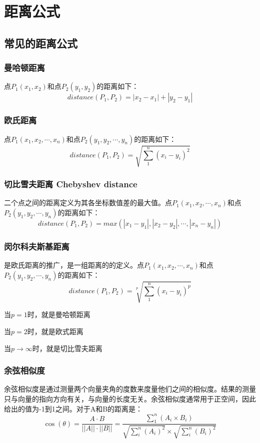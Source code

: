 \documentclass[12pt]{article}
\begin{document}
\section{距离公式}
\subsection{常见的距离公式}
\subsubsection{曼哈顿距离}
点$P_1(x_1, x_2)$和点$P_2(y_1, y_2)$的距离如下：
$$
distance(P_1, P_2) = |x_2 - x_1| + |y_2 - y_1|
$$

\subsubsection{欧氏距离}
点$P_1(x_1, x_2, \cdots, x_n)$和点$P_2(y_1, y_2, \cdots, y_n)$的距离如下：
$$
distance(P_1, P_2) = \sqrt{\sum_1^n(x_i-y_i)^2}
$$

\subsubsection{切比雪夫距离 Chebyshev distance}
二个点之间的距离定义为其各坐标数值差的最大值。点$P_1(x_1, x_2, \cdots, x_n)$和点$P_2(y_1, y_2, \cdots, y_n)$的距离如下：
$$
distance(P_1, P_2) = max(|x_1-y_1|, |x_2-y_2|, \cdots,|x_n-y_n|)
$$

\subsubsection{闵尔科夫斯基距离}
是欧氏距离的推广，是一组距离的的定义。点$P_1(x_1, x_2, \cdots, x_n)$和点$P_2(y_1, y_2, \cdots, y_n)$的距离如下：
$$
distance(P_1, P_2) = \sqrt[p]{\sum_1^n(x_i-y_i)^p}
$$

当$p=1$时，就是曼哈顿距离

当$p=2$时，就是欧式距离

当$p\rightarrow \infty$时，就是切比雪夫距离

\subsubsection{余弦相似度}
余弦相似度是通过测量两个向量夹角的度数来度量他们之间的相似度。结果的测量只与向量的指向方向有关，与向量的长度无关。余弦相似度通常用于正空间，因此给出的值为-1到1之间。对于A和B的距离是：
$$
\cos(\theta) = \frac{A\cdot B}{||A||\cdot||B||} = \frac{\sum_1^n(A_i \times B_i)}{\sqrt{\sum_i^n(A_i)^2} \times \sqrt{\sum_i^n(B_i)^2}}
$$
\end{document}
